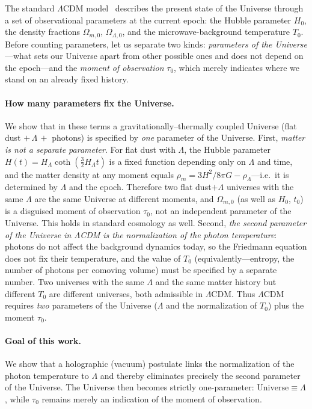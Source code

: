 \documentclass[10pt,a4paper]{article}
\begin{document}
The standard $\Lambda$CDM model~\cite{Planck2018} describes the present state of the Universe through a set of observational parameters at the current epoch: the Hubble parameter $H_0$, the density fractions $\Omega_{m,0}$, $\Omega_{\Lambda,0}$, and the microwave-background temperature $T_0$. Before counting parameters, let us separate two kinds: \emph{parameters of the Universe}---what sets our Universe apart from other possible ones and does not depend on the epoch---and the \emph{moment of observation} $\tau_0$, which merely indicates where we stand on an already fixed history.

\paragraph{How many parameters fix the Universe.} We show that in these terms a gravitationally--thermally coupled Universe (flat dust $+\,\Lambda\,+$ photons) is specified by \emph{one} parameter of the Universe. First, \emph{matter is not a separate parameter}. For flat dust with $\Lambda$, the Hubble parameter $H(t)=H_\Lambda\coth(\tfrac{3}{2}H_\Lambda t)$ is a fixed function depending only on $\Lambda$ and time, and the matter density at any moment equals $\rho_m=3H^2/8\pi G-\rho_\Lambda$---i.e.\ it is determined by $\Lambda$ and the epoch. Therefore two flat dust$+\Lambda$ universes with the same $\Lambda$ are the same Universe at different moments, and $\Omega_{m,0}$ (as well as $H_0$, $t_0$) is a disguised moment of observation $\tau_0$, not an independent parameter of the Universe. This holds in standard cosmology as well. Second, \emph{the second parameter of the Universe in $\Lambda$CDM is the normalization of the photon temperature}: photons do not affect the background dynamics today, so the Friedmann equation does not fix their temperature, and the value of $T_0$ (equivalently---entropy, the number of photons per comoving volume) must be specified by a separate number. Two universes with the same $\Lambda$ and the same matter history but different $T_0$ are different universes, both admissible in $\Lambda$CDM. Thus $\Lambda$CDM requires \emph{two} parameters of the Universe ($\Lambda$ and the normalization of $T_0$) plus the moment $\tau_0$.

\paragraph{Goal of this work.} We show that a holographic (vacuum) postulate links the normalization of the photon temperature to $\Lambda$ and thereby eliminates precisely the second parameter of the Universe. The Universe then becomes strictly one-parameter: $\text{Universe}\equiv\Lambda$, while $\tau_0$ remains merely an indication of the moment of observation.
\end{document}

